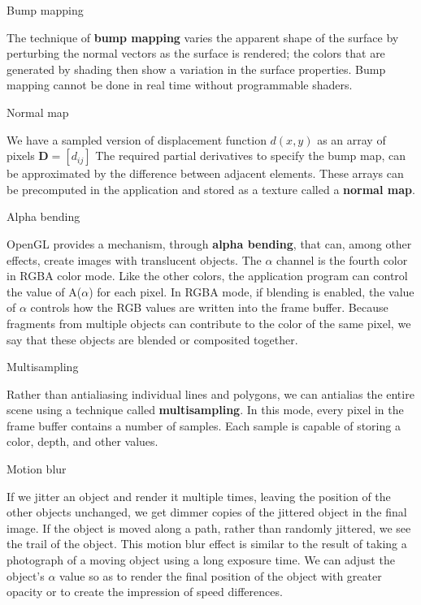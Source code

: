 \documentclass[10pt,a4paper]{article}
\begin{document}
\begin{enumerate}
		{\large \item Bump mapping}
		
		The technique of \textbf{bump mapping} varies the apparent shape of the surface by perturbing the normal vectors as the surface is rendered; the colors that are generated by shading then show a variation in the surface properties. Bump mapping cannot be done in real time without programmable shaders.\\
		
		{\large \item Normal map}
		
		We have a sampled version of displacement function $ d(x, y) $ as an array of pixels $ \textbf{D} = [d_{ij}] $ The required partial derivatives to specify the bump map,  can be approximated by the difference between adjacent elements. These arrays can be precomputed in the application and stored as a texture called a \textbf{normal map}.\\
		
		{\large \item Alpha bending}
		
		OpenGL provides a mechanism, through \textbf{alpha bending}, that  can, among other effects, create images with translucent objects. The $ \alpha $ channel is the fourth color in RGBA color mode. Like the other colors, the application program can control the value of A($ \alpha $) for each pixel. In RGBA mode, if blending is enabled, the value of $ \alpha $ controls how the RGB values are written into the frame buffer. Because fragments from multiple objects can contribute to the color of the same pixel, we say that these objects are blended or composited together.\\
		
		{\large \item Multisampling}
		
		Rather than antialiasing individual lines and polygons, we can antialias the entire scene using a technique called \textbf{multisampling}. In this mode, every pixel in the frame buffer contains a number of samples. Each sample is capable of storing a color, depth, and other values.\\
		
		{\large \item Motion blur}
		
		If we jitter an object and render it multiple times, leaving the position of the other objects unchanged, we get dimmer copies of the jittered object in the final image. If the object is moved along a path, rather than randomly jittered, we see the trail of the object. This motion blur effect is similar to the result of taking a photograph of a moving object using a long exposure time. We can adjust the object's $ \alpha $ value so as to render the final position of the object with greater opacity or to create the impression of speed differences.\\
		

\end{enumerate}
\end{document}
